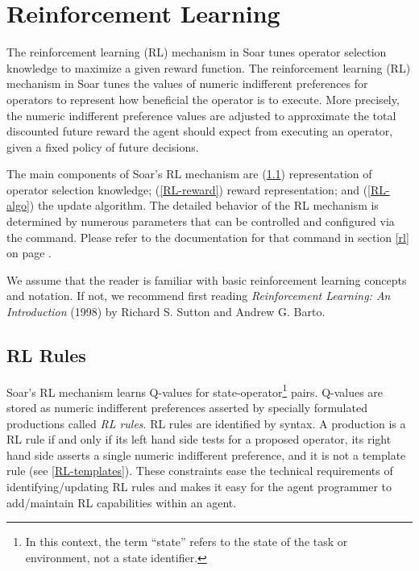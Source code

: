 \chapter{Reinforcement Learning}
\label{RL}

The reinforcement learning (RL) mechanism in Soar tunes operator selection knowledge to maximize a given reward function.
The reinforcement learning (RL) mechanism in Soar tunes the values of numeric indifferent preferences for operators to represent how beneficial the operator is to execute.
More precisely, the numeric indifferent preference values are adjusted to approximate the total discounted future reward the agent should expect from executing an operator, given a fixed policy of future decisions.

The main components of Soar's RL mechanism are (\ref{RL-rules}) representation of operator selection knowledge; (\ref{RL-reward}) reward representation; and (\ref{RL-algo}) the update algorithm. 
The detailed behavior of the RL mechanism is determined by numerous parameters that can be controlled and configured via the  command. Please refer to the documentation for that command in section \ref{rl} on page \pageref{rl}.

We assume that the reader is familiar with basic reinforcement learning concepts and notation. If not, we recommend first reading \emph{Reinforcement Learning: An Introduction} (1998) by Richard S. Sutton and Andrew G. Barto.

\section{RL Rules}
\label{RL-rules}

Soar's RL mechanism learns Q-values for state-operator\footnote{In this context, the term ``state'' refers to the state of the task or environment, not a state identifier.} pairs.
Q-values are stored as numeric indifferent preferences asserted by specially formulated productions called \emph{RL rules}.
RL rules are identified by syntax.
A production is a RL rule if and only if its left hand side tests for a proposed operator, its right hand side asserts a single numeric indifferent preference, and it is not a template rule (see \ref{RL-templates}).
These constraints ease the technical requirements of identifying/updating RL rules and makes it easy for the agent programmer to add/maintain RL capabilities within an agent.

